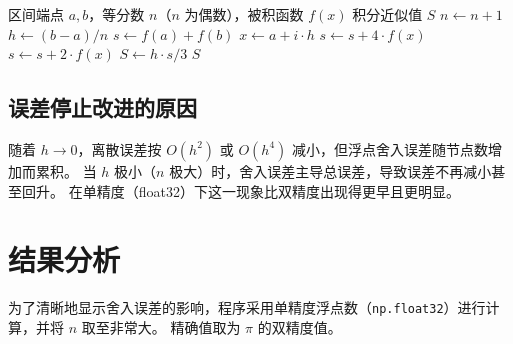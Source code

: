 \documentclass{article}
\begin{document}
\begin{algorithm}[H]
\caption{复合 Simpson 公式}
\begin{algorithmic}[1]
\REQUIRE 区间端点 $a, b$，等分数 $n$（$n$ 为偶数），被积函数 $f(x)$
\ENSURE 积分近似值 $S$
    \STATE $n \gets n + 1$
\ENDIF
\STATE $h \gets (b - a) / n$
\STATE $s \gets f(a) + f(b)$
    \STATE $x \gets a + i \cdot h$
        \STATE $s \gets s + 4 \cdot f(x)$
    \ELSE
        \STATE $s \gets s + 2 \cdot f(x)$
    \ENDIF
\ENDFOR
\STATE $S \gets h \cdot s / 3$
\RETURN $S$
\end{algorithmic}
\end{algorithm}

\subsection{误差停止改进的原因}
随着 $h \to 0$，离散误差按 $O(h^2)$ 或 $O(h^4)$ 减小，但浮点舍入误差随节点数增加而累积。 当 $h$ 极小（$n$ 极大）时，舍入误差主导总误差，导致误差不再减小甚至回升。 在单精度（float32）下这一现象比双精度出现得更早且更明显。

\section{结果分析}

为了清晰地显示舍入误差的影响，程序采用单精度浮点数（\texttt{np.float32}）进行计算，并将 $n$ 取至非常大。 精确值取为 $\pi$ 的双精度值。
\end{document}
